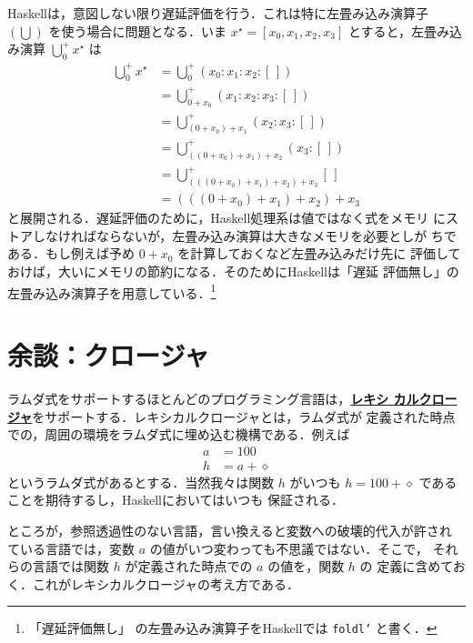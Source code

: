 \documentclass[a5paper,twoside,fleqn,draft]{jsbook}
\newcommand{\programminglanguage}[1]{\textsf{#1}}
\newcommand{\haskell}{\programminglanguage{Haskell}}
\newcommand{\keyword}[1]{{\underline{\textbf{#1}}}}
\newcommand{\code}[1]{\texttt{#1}}
\newcommand{\mEmptyList}{{[\,]}}
\newcommand{\mAnonParam}{\diamond}
\DeclareMathOperator*{\mFold}{\bigcup}
\newcommand{\mListWith}[1]{\left[#1\right]}
\newcommand{\mList}[1]{{#1}^\mathrm{\star}}
\begin{document}
\haskell は，意図しない限り遅延評価を行う．これは特に左畳み込み演算子
$(\mFold)$ を使う場合に問題となる．いま
$\mList{x}=\mListWith{x_0,x_1,x_2,x_3}$ とすると，左畳み込み演算
$\mFold^+_0\mList{x}$ は
\begin{align}
  \mFold^+_0\mList{x}&=\mFold^+_0{}(x_0:x_1:x_2:\mEmptyList)\\
  &=\mFold^+_{0+x_0}{}(x_1:x_2:x_3:\mEmptyList)\\
  &=\mFold^+_{(0+x_0)+x_1}{}(x_2:x_3:\mEmptyList)\\
  &=\mFold^+_{((0+x_0)+x_1)+x_2}{}(x_3:\mEmptyList)\\
  &=\mFold^+_{(((0+x_0)+x_1)+x_2)+x_3}{}\mEmptyList\\
  &=(((0+x_0)+x_1)+x_2)+x_3
\end{align}
と展開される．遅延評価のために，\haskell 処理系は値ではなく式をメモリ
にストアしなければならないが，左畳み込み演算は大きなメモリを必要としが
ちである．もし例えば予め $0+x_0$ を計算しておくなど左畳み込みだけ先に
評価しておけば，大いにメモリの節約になる．そのために\haskell は「遅延
  評価無し」の左畳み込み演算子を用意している．\footnote{「遅延評価無し」
  の左畳み込み演算子を\haskell では \code{foldl'} と書く．}


%

\section{余談：クロージャ}

ラムダ式をサポートするほとんどのプログラミング言語は，\keyword{レキシ
  カルクロージャ}をサポートする．レキシカルクロージャとは，ラムダ式が
定義された時点での，周囲の環境をラムダ式に埋め込む機構である．例えば
\begin{align}
a&=100\\ h&=a+\mAnonParam
\end{align}
というラムダ式があるとする．当然我々は関数 $h$ がいつも
$h=100+\mAnonParam$ であることを期待するし，\haskell においてはいつも
保証される．

ところが，参照透過性のない言語，言い換えると変数への破壊的代入が許され
ている言語では，変数 $a$ の値がいつ変わっても不思議ではない．そこで，
それらの言語では関数 $h$ が定義された時点での $a$ の値を，関数 $h$ の
定義に含めておく．これがレキシカルクロージャの考え方である．
\end{document}
